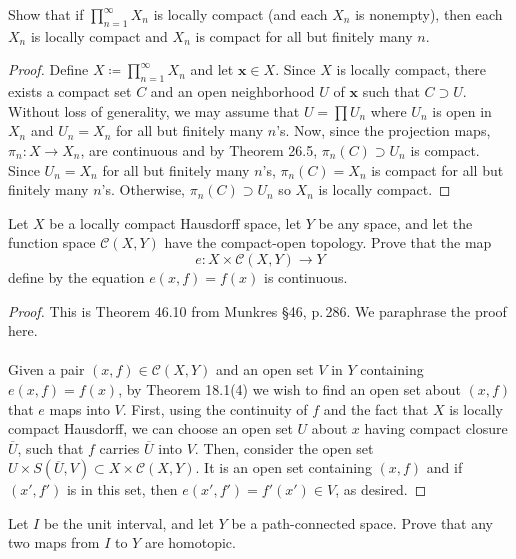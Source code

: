 \begin{problem}
Show that if $\prod_{n=1}^\infty X_n$ is locally compact (and
each $X_n$ is nonempty), then each $X_n$ is locally compact and
$X_n$ is compact for all but finitely many $n$.
\end{problem}
\begin{proof}
Define $X\coloneqq\prod_{n=1}^\infty X_n$ and let $\mathbf{x}\in
X$. Since $X$ is locally compact, there exists a compact set $C$
and an open neighborhood $U$ of $\mathbf{x}$ such that $C\supset
U$. Without loss of generality, we may assume that $U=\prod U_n$
where $U_n$ is open in $X_n$ and $U_n=X_n$ for all but finitely
many $n$'s. Now, since the projection maps, $\pi_n\colon X\to
X_n$, are continuous and by Theorem 26.5, $\pi_n(C)\supset U_n$
is compact. Since $U_n=X_n$ for all but finitely many $n$'s,
$\pi_n(C)=X_n$ is compact for all but finitely many
$n$'s. Otherwise, $\pi_n(C)\supset U_n$ so $X_n$ is locally
compact.
\end{proof}
\begin{problem}
Let $X$ be a locally compact Hausdorff space, let $Y$ be any
space, and let the function space $\mathcal{C}(X,Y)$ have the
compact-open topology. Prove that the map
\[
e\colon X\times\mathcal{C}(X,Y)\to Y
\]
define by the equation $e(x,f)=f(x)$ is continuous.
\end{problem}
\begin{proof}
This is Theorem 46.10 from Munkres \S46, p.\,286. We paraphrase
the proof here.
\\\\
Given a pair $(x,f)\in\mathcal{C}(X,Y)$ and an open set $V$ in
$Y$ containing $e(x,f)=f(x)$, by Theorem 18.1(4) we wish to find
an open set about $(x,f)$ that $e$ maps into $V$. First, using
the continuity of $f$ and the fact that $X$ is locally compact
Hausdorff, we can choose an open set $U$ about $x$ having compact
closure $\overline U$, such that $f$ carries $\overline U$ into
$V$. Then, consider the open set $U\times S(\overline U,V)\subset
X\times\mathcal{C}(X,Y)$. It is an open set containing $(x,f)$
and if $(x',f')$ is in this set, then $e(x',f')=f'(x')\in V$, as
desired.
\end{proof}
\begin{problem}
Let $I$ be the unit interval, and let $Y$ be a path-connected
space. Prove that any two maps from $I$ to $Y$ are homotopic.
\end{problem}
